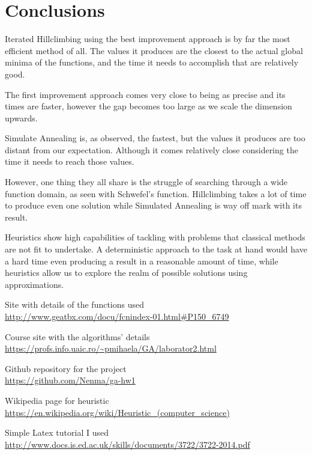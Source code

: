 \documentclass{article}
\begin{document}
\newpage

\section{Conclusions}
Iterated Hillclimbing using the best improvement approach is by far the most efficient method of all.
The values it produces are the closest to the actual global minima of the functions, and the time it needs to accomplish that are relatively good.

The first improvement approach comes very close to being as precise and its times are faster, however the gap becomes too large as we scale the dimension upwards.

Simulate Annealing is, as observed, the fastest, but the values it produces are too distant from our expectation. Although it comes relatively close considering the time it needs to reach those values.

However, one thing they all share is the struggle of searching through a wide function domain, as seen with Schwefel's function. Hillclimbing takes a lot of time to produce even one solution while Simulated Annealing is way off mark with its result.

\vspace{5mm}

Heuristics show high capabilities of tackling with problems that classical methods are not fit to undertake.
A deterministic approach to the task at hand would have a hard time even producing a result in a reasonable amount of time, while heuristics allow us to explore the realm of possible solutions using approximations.

\begin{thebibliography}{9}

  Site with details of the functions used \\
  \url{http://www.geatbx.com/docu/fcnindex-01.html#P150_6749}

  Course site with the algorithms' details \\
  \url{https://profs.info.uaic.ro/~pmihaela/GA/laborator2.html}

  Github repository for the project \\
  \url{https://github.com/Nenma/ga-hw1}

  Wikipedia page for heuristic \\
  \url{https://en.wikipedia.org/wiki/Heuristic_(computer_science)}
  
  Simple Latex tutorial I used \\
  \url{http://www.docs.is.ed.ac.uk/skills/documents/3722/3722-2014.pdf}

\end{thebibliography}  
\end{document}

